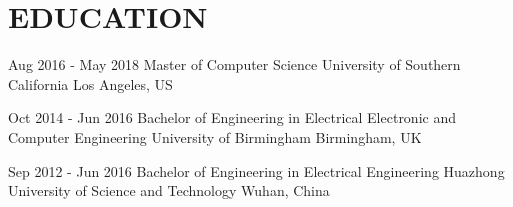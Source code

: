 \section{EDUCATION}

{\edu
{Aug 2016 - May 2018}
{Master of Computer Science}
{University of Southern California}
{Los Angeles, US}
{}{}{}}

{\edu
{Oct 2014 - Jun 2016}
{Bachelor of Engineering in Electrical Electronic and Computer Engineering}
{University of Birmingham}
{Birmingham, UK}
{}{}{}}

{\edu
{Sep 2012 - Jun 2016}
{Bachelor of Engineering in Electrical Engineering}
{Huazhong University of Science and Technology}
{Wuhan, China}
{}{}{}}

